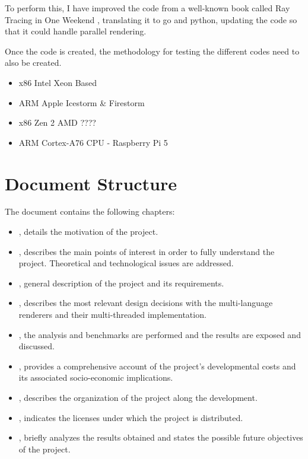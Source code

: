 To perform this, I have improved the code from a well-known book called Ray Tracing in One Weekend
\cite{Shirley2016RTW1}, translating it to go and python, updating the code so that it could handle parallel rendering. 

Once the code is created, the methodology for testing the different codes need to also be created. \begin{itemize}
    \item x86 Intel Xeon Based
    \item ARM Apple Icestorm \& Firestorm
    \item x86 Zen 2 AMD ????
    \item ARM Cortex-A76 CPU - Raspberry Pi 5
\end{itemize} 

\section{Document Structure}\label{sec:structure}
The document contains the following chapters:
\begin{itemize}
  \item {}, details the motivation of the project.
  \item {}, describes the main points of interest in order to
fully understand the project. Theoretical and technological issues are addressed.
  \item {}, general description of the project and its requirements.
  \item {}, describes the most relevant design decisions with the multi-language renderers and their multi-threaded implementation.
  \item {}, the analysis and benchmarks are performed and the results are exposed and discussed.
  \item {}, provides a comprehensive account of the project's developmental costs and its associated socio-economic implications.
  \item {}, describes the organization of the project along the development.
  \item {}, indicates the licenses under which the project is distributed.
  \item {}, briefly analyzes the results obtained and states the possible future objectives of the project.
\end{itemize}